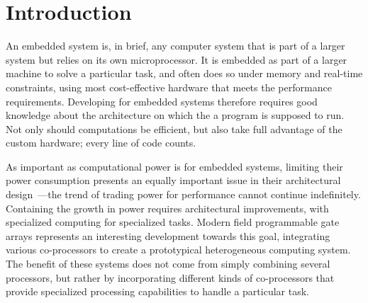 \documentclass[../paper.tex]{subfiles}
\begin{document}
\chapter{Introduction}
\label{intro}

An embedded system is, in brief, any computer system that is part of a larger system but relies on its own microprocessor. It is embedded as part of a larger machine to solve a particular task, and often does so under memory and real-time constraints, using most cost-effective hardware that meets the performance requirements. Developing for embedded systems therefore requires good knowledge about the architecture on which the a program is supposed to run. Not only should computations be efficient, but also take full advantage of the custom hardware; every line of code counts.




As important as computational power is for embedded systems, limiting their power consumption presents an equally important issue in their architectural design~\cite{mudge2001}---the trend of trading power for performance cannot continue indefinitely. Containing the growth in power requires architectural improvements, with specialized computing for specialized tasks. Modern field programmable gate arrays represents an interesting development towards this goal, integrating various co-processors to create a prototypical heterogeneous computing system. The benefit of these systems does not come from simply combining several processors, but rather by incorporating different kinds of co-processors that provide specialized processing capabilities to handle a particular task.
\end{document}
